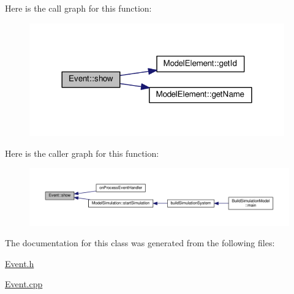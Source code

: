Here is the call graph for this function\+:\nopagebreak
\begin{figure}[H]
\begin{center}
\leavevmode
\includegraphics[width=312pt]{class_event_a640f132001d454af52cb0d0e20ebb856_cgraph}
\end{center}
\end{figure}




Here is the caller graph for this function\+:
\nopagebreak
\begin{figure}[H]
\begin{center}
\leavevmode
\includegraphics[width=350pt]{class_event_a640f132001d454af52cb0d0e20ebb856_icgraph}
\end{center}
\end{figure}




The documentation for this class was generated from the following files\+:\begin{DoxyCompactItemize}
\item 
\hyperlink{_event_8h}{Event.\+h}\item 
\hyperlink{_event_8cpp}{Event.\+cpp}\end{DoxyCompactItemize}
